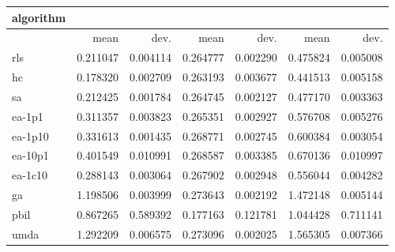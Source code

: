 \begin{tabular}{@{}l*{6}{>{{}}N{1}{2}}@{}}
\toprule
{algorithm} &  &  &  \\
\midrule
& {mean} & {dev.} & {mean} & {dev.} & {mean} & {dev.} \\
\midrule
rls & 0.211047 & 0.004114 & 0.264777 & 0.002290 & 0.475824 & 0.005008 \\
 hc & 0.178320 & 0.002709 & 0.263193 & 0.003677 & 0.441513 & 0.005158 \\
 sa & 0.212425 & 0.001784 & 0.264745 & 0.002127 & 0.477170 & 0.003363 \\
 ea-1p1 & 0.311357 & 0.003823 & 0.265351 & 0.002927 & 0.576708 & 0.005276 \\
 ea-1p10 & 0.331613 & 0.001435 & 0.268771 & 0.002745 & 0.600384 & 0.003054 \\
 ea-10p1 & 0.401549 & 0.010991 & 0.268587 & 0.003385 & 0.670136 & 0.010997 \\
 ea-1c10 & 0.288143 & 0.003064 & 0.267902 & 0.002948 & 0.556044 & 0.004282 \\
 ga & 1.198506 & 0.003999 & 0.273643 & 0.002192 & 1.472148 & 0.005144 \\
 pbil & 0.867265 & 0.589392 & 0.177163 & 0.121781 & 1.044428 & 0.711141 \\
 umda & 1.292209 & 0.006575 & 0.273096 & 0.002025 & 1.565305 & 0.007366 \\
 \bottomrule
\end{tabular}

